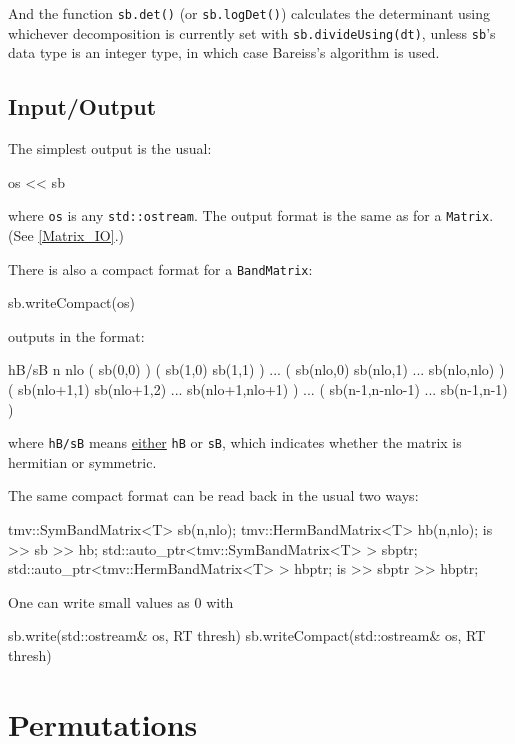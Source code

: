 \documentclass[twoside,letterpaper,11pt]{article}
\renewcommand{\tt}[1]{{\lstinline {#1}}}
\begin{document}
And the function \tt{sb.det()} (or \tt{sb.logDet()}) calculates the determinant
using whichever decomposition is currently set with \tt{sb.divideUsing(dt)},
unless \tt{sb}'s data type is an integer type, in which case Bareiss's algorithm 
is used.

\subsection{Input/Output}
\label{SymBandMatrix_IO}

The simplest output is the usual:
\begin{tmvcode}
os << sb
\end{tmvcode}
where \tt{os} is any \tt{std::ostream}.
The output format is the same as for a \tt{Matrix}.
(See \ref{Matrix_IO}.)

There is also a compact format for a \tt{BandMatrix}:
\begin{tmvcode}
sb.writeCompact(os)
\end{tmvcode}
outputs in the format:
\begin{tmvcode}
hB/sB n nlo
( sb(0,0)  )
( sb(1,0)  sb(1,1)  )
...
( sb(nlo,0)  sb(nlo,1) ...  sb(nlo,nlo) )
( sb(nlo+1,1)  sb(nlo+1,2) ...  sb(nlo+1,nlo+1) )
...
( sb(n-1,n-nlo-1)  ... sb(n-1,n-1) )
\end{tmvcode}
where \tt{hB/sB} means \underline{either} \tt{hB} or \tt{sB}, 
which indicates whether the matrix is hermitian or symmetric.

The same compact format can be read back in the usual two ways:
\begin{tmvcode}
tmv::SymBandMatrix<T> sb(n,nlo);
tmv::HermBandMatrix<T> hb(n,nlo);
is >> sb >> hb;
std::auto_ptr<tmv::SymBandMatrix<T> > sbptr;
std::auto_ptr<tmv::HermBandMatrix<T> > hbptr;
is >> sbptr >> hbptr;
\end{tmvcode}

One can write small values as 0 with
\begin{tmvcode}
sb.write(std::ostream& os, RT thresh)
sb.writeCompact(std::ostream& os, RT thresh)
\end{tmvcode}

\newpage
\section{Permutations}
\label{Permutation}
\end{document}
